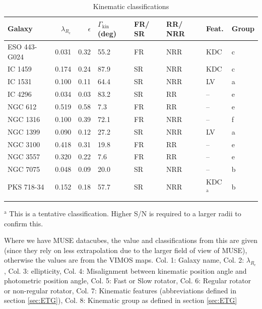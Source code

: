 		\begin{table}
		\begin{threeparttable}
			\centering
			\caption{Kinematic classifications}
			\label{tab:classify}
			\begin{tabular}{l r r p{0.7cm} l l l l}
				\hline
				\hline
				Galaxy		& $\lambda_{R_e}$ & $\epsilon$  & $\Gamma_\text{kin}$ (deg) & FR/ SR 	& RR/ NRR 	& Feat. & Group 	\\
				\hline 
				ESO 443-G024 & 0.031 & 0.32 & 55.2 	& FR & NRR & KDC & c \\
				IC 1459 	& 0.174 & 0.24 & 87.9	& SR & NRR & KDC & c \\
				IC 1531 	& 0.100 & 0.11 & 64.4 	& SR & NRR & LV & a \\
				IC 4296		& 0.034 & 0.03 & 83.2 	& SR & RR & -- & e \\
				NGC 612 	& 0.519 & 0.58 & \phantom{0}7.3 	& FR & RR & -- & e \\
				NGC 1316 	& 0.100 & 0.39 & 72.1 	& FR & NRR & -- & f \\
				NGC 1399 	& 0.090 & 0.12 & 27.2 	& SR & NRR & LV & a \\
				NGC 3100 	& 0.418 & 0.31 & 19.8 	& FR & RR & -- & e \\
				NGC 3557 	& 0.320 & 0.22 & \phantom{0}7.6 	& FR & RR & -- & e\\
				NGC 7075 	& 0.048 & 0.09 & 20.0 	& SR & NRR & -- & b \\
				PKS 718-34  & 0.152 & 0.18 & 57.7 	& SR & NRR & KDC$^\text{a}$ & b\\
				\hline
				\hline
				\multicolumn{7}{L{.9\textwidth}}{\footnotesize } \\ %
			\end{tabular}
			\begin{tablenotes}
			\small
			\item $^\text{a}$ This is a tentative classification. Higher S/N is required to a larger radii to confirm this.
			\item Where we have MUSE datacubes, the value and classifications from this are given (since they rely on less extrapolation due to the larger field of view of MUSE), otherwise the values are from the VIMOS maps. Col. 1: Galaxy name, Col. 2: $\lambda_{R_e}$, Col. 3: ellipticity, Col. 4: Misalignment between kinematic position angle and photometric position angle, Col. 5: Fast or Slow rotator, Col. 6: Regular rotator or non-regular rotator, Col. 7: Kinematic features (abbreviations defined in section \ref{sec:ETG}), Col. 8: Kinematic group as defined in section \ref{sec:ETG}
			\end{tablenotes}
		\end{threeparttable}
		\end{table}

